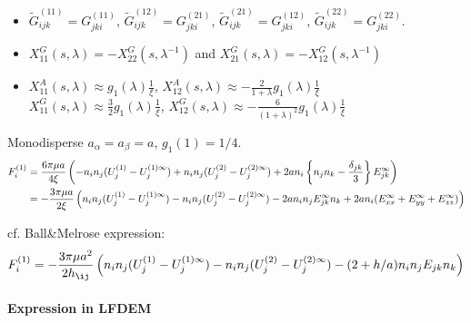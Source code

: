 \documentclass[12pt]{article}
\begin{document}
\begin{itemize}
 \item $\tilde{G}_{ijk}^{(11)}=G_{jki}^{(11)}$,
$\tilde{G}_{ijk}^{(12)}=G_{jki}^{(21)}$,
$\tilde{G}_{ijk}^{(21)}=G_{jki}^{(12)}$,
$\tilde{G}_{ijk}^{(22)}=G_{jki}^{(22)}$.

 \item 
$X_{11}^{G}(s,\lambda)
= - X_{22}^{G} (s, \lambda^{-1})$
and $X_{21}^{G}(s,\lambda)
= - X_{12}^{G} (s, \lambda^{-1})$

 \item 
$X_{11}^{A}(s,\lambda)\approx g_1(\lambda) \frac{1}{\xi}$, 
$X_{12}^{A}(s,\lambda) \approx -\frac{2}{1+\lambda}g_1(\lambda) \frac{1}{\xi}$\\
$X_{11}^{G}(s,\lambda)\approx \frac{3}{2} g_1(\lambda) \frac{1}{\xi}$,
$X_{12}^{G}(s,\lambda)\approx -\frac{6}{(1+\lambda)^2} g_1(\lambda) \frac{1}{\xi}$   
\end{itemize}
Monodisperse $a_\alpha = a_{\beta}=a$, $g_1(1)=1/4$.
\begin{align}
 F^{(1)}_i
&= 
\frac{6 \pi\mu a}{4\xi}
\left(
-   n_i n_j
(U_{j}^{(1)}-U_{j}^{(1)\infty})
+   n_i n_j
(U_{j}^{(2)}-U_{j}^{(2)\infty})
+  
2a n_i\left\{n_j n_k - \frac{\delta_{jk}}{3} \right\} E^{\infty}_{jk}
\right) \notag \\
&= 
-
\frac{3 \pi\mu a}{2\xi}
\left(
   n_i n_j
(U_{j}^{(1)}-U_{j}^{(1)\infty})
-   n_i n_j
(U_{j}^{(2)}-U_{j}^{(2)\infty})
-  
2a n_in_j  E^{\infty}_{jk}n_k
+2an_i(E^{\infty}_{xx}+E^{\infty}_{yy}+E^{\infty}_{zz} )
\right)
\end{align}

cf. Ball\&Melrose expression:
\begin{equation}
F_i^{(1)}
=
- 
\frac{3 \pi \mu a^2}{2 h_{\ij}}
\left(
n_{i} n_j (U^{(1)}_j-U^{(1)\infty}_j)
- n_{i} n_j (U^{(2)}_j-U^{(2)\infty}_j)
- (2+h/a) n_i n_j  E_{jk}n_k
\right) 
 \end{equation}

\paragraph{Expression in LFDEM}
\end{document}
